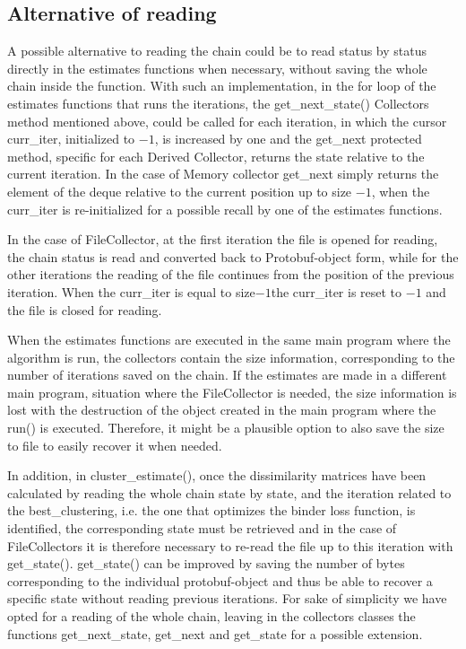 \subsection{Alternative of reading}

A possible alternative to reading the chain could be to read status by status directly in the estimates functions when necessary, without saving the whole chain inside the function. 
With such an implementation, in the for loop of the estimates functions that runs the iterations, the get\_next\_state() Collectors method mentioned above,  could be called for each iteration, in which the cursor curr\_iter, initialized to $-1$, is increased by one and the get\_next protected method, specific for each Derived Collector, returns the state relative to the current iteration. 
In the case of Memory collector get\_next simply returns the element of the deque relative to the current position up to size $-1$, when the curr\_iter is re-initialized for a possible recall by one of the estimates functions.

In the case of FileCollector, at the first iteration the file is opened for reading, the chain status is read and converted back to Protobuf-object form, while for the other iterations the reading of the file continues from the position of the previous iteration. When the curr\_iter is equal to size$-1$the curr\_iter is reset to $-1$ and the file is closed for reading.

When the estimates functions are executed in the same main program where the algorithm is run, the collectors contain the size information, corresponding to the number of iterations saved on the chain. 
If the estimates are made in a different main program, situation where the FileCollector is needed, the size information is lost with the destruction of the object created in the main program where the run() is executed. Therefore, it might be a plausible option to also save the size to file to easily recover it when needed. 

In addition, in cluster\_estimate(),  once the dissimilarity matrices have been calculated by reading the whole chain state by state, and the iteration related to the best\_clustering, i.e. the one that optimizes the binder loss function, is identified, the corresponding state must be retrieved and in the case of FileCollectors it is therefore necessary to re-read the file up to this iteration with get\_state(). get\_state() can be improved by saving the number of bytes corresponding to the individual protobuf-object and thus be able to recover a specific state without reading previous iterations. For sake of simplicity we have opted for a reading of the whole chain, leaving in the collectors classes the functions get\_next\_state, get\_next and get\_state for a possible extension.